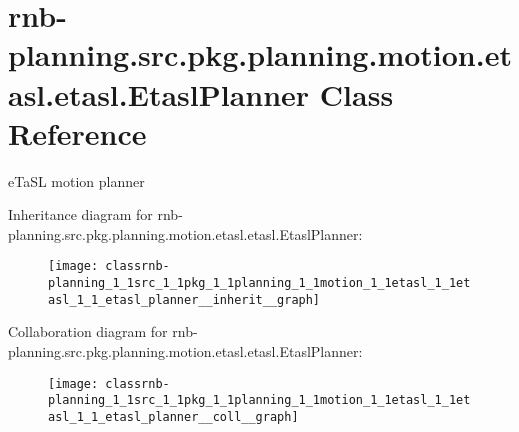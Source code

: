 \hypertarget{classrnb-planning_1_1src_1_1pkg_1_1planning_1_1motion_1_1etasl_1_1etasl_1_1_etasl_planner}{}\section{rnb-\/planning.src.\+pkg.\+planning.\+motion.\+etasl.\+etasl.\+Etasl\+Planner Class Reference}
\label{classrnb-planning_1_1src_1_1pkg_1_1planning_1_1motion_1_1etasl_1_1etasl_1_1_etasl_planner}


e\+Ta\+SL motion planner  




Inheritance diagram for rnb-\/planning.src.\+pkg.\+planning.\+motion.\+etasl.\+etasl.\+Etasl\+Planner\+:
\nopagebreak
\begin{figure}[H]
\begin{center}
\leavevmode
\texttt{[image: classrnb-planning\_1\_1src\_1\_1pkg\_1\_1planning\_1\_1motion\_1\_1etasl\_1\_1etasl\_1\_1\_etasl\_planner\_\_inherit\_\_graph]}
\end{center}
\end{figure}


Collaboration diagram for rnb-\/planning.src.\+pkg.\+planning.\+motion.\+etasl.\+etasl.\+Etasl\+Planner\+:
\nopagebreak
\begin{figure}[H]
\begin{center}
\leavevmode
\texttt{[image: classrnb-planning\_1\_1src\_1\_1pkg\_1\_1planning\_1\_1motion\_1\_1etasl\_1\_1etasl\_1\_1\_etasl\_planner\_\_coll\_\_graph]}
\end{center}
\end{figure}
